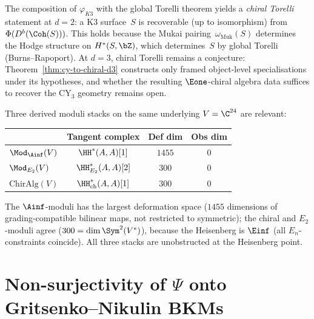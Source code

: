 \begin{remark}
\label{rem:chiral-torelli}
The composition of $\varphi_{K3}$ with the global Torelli theorem yields a \emph{chiral Torelli} statement at $d = 2$: a K3 surface~$S$ is recoverable (up to isomorphism) from $\Phi(D^b(\Coh(S)))$. This holds because the Mukai pairing~$\omega_{\mathrm{Muk}}(S)$ determines the Hodge structure on $H^*(S, \bZ)$, which determines~$S$ by global Torelli (Burns--Rapoport). At $d = 3$, chiral Torelli remains a conjecture: Theorem~\ref{thm:cy-to-chiral-d3} constructs only framed object-level specialisations under its hypotheses, and whether the resulting $\Eone$-chiral algebra data suffices to recover the CY$_3$ geometry remains open.
\end{remark}

\begin{remark}
\label{rem:moduli-comparison}
Three derived moduli stacks on the same underlying $V = \C^{24}$ are relevant:
\begin{center}
\renewcommand{\arraystretch}{1.3}
\begin{tabular}{lccc}
 & \textbf{Tangent complex} & \textbf{Def dim} & \textbf{Obs dim} \\
\hline
$\Mod_{\Ainf}(V)$ & $\HH^*(A, A)[1]$ & $1455$ & $0$ \\
$\Mod_{E_2}(V)$ & $\HH^*_{E_2}(A, A)[2]$ & $300$ & $0$ \\
$\mathrm{ChirAlg}(V)$ & $\HH^*_{\mathrm{ch}}(A, A)[1]$ & $300$ & $0$ \\
\end{tabular}
\end{center}
The $\Ainf$-moduli has the largest deformation space ($1455$ dimensions of grading-compatible bilinear maps, not restricted to symmetric); the chiral and $E_2$-moduli agree ($300 = \dim\Sym^2(V^*)$), because the Heisenberg is $\Einf$ (all $E_n$-constraints coincide). All three stacks are unobstructed at the Heisenberg point.
\end{remark}


\section{Non-surjectivity of \texorpdfstring{$\Psi$}{Psi} onto Gritsenko--Nikulin BKMs}
\label{sec:psi-nonsurjectivity-gn}

